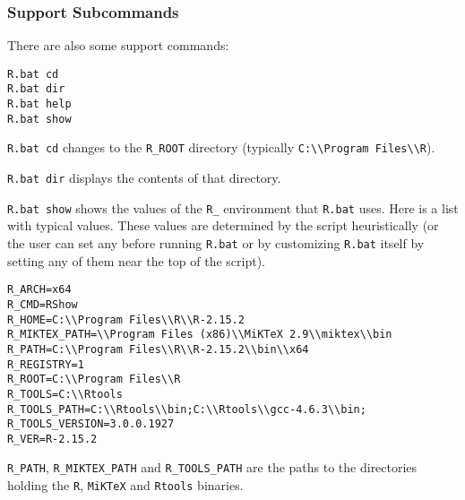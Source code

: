 \subsubsection{Support Subcommands}

There are also some support commands:

\begin{verbatim}
R.bat cd
R.bat dir
R.bat help
R.bat show
\end{verbatim}

\texttt{R.bat cd} changes to the \texttt{R\_ROOT} directory (typically
\texttt{C:\textbackslash{}\textbackslash{}Program Files\textbackslash{}\textbackslash{}R}).

\texttt{R.bat dir} displays the contents of that directory.

\texttt{R.bat show} shows the values of the \texttt{R\_} environment
that \texttt{R.bat} uses. Here is a list with typical values. These
values are determined by the script heuristically (or the user can set
any before running \texttt{R.bat} or by customizing \texttt{R.bat}
itself by setting any of them near the top of the script).

\begin{verbatim}
R_ARCH=x64
R_CMD=RShow
R_HOME=C:\\Program Files\\R\\R-2.15.2
R_MIKTEX_PATH=\\Program Files (x86)\\MiKTeX 2.9\\miktex\\bin
R_PATH=C:\\Program Files\\R\\R-2.15.2\\bin\\x64
R_REGISTRY=1
R_ROOT=C:\\Program Files\\R
R_TOOLS=C:\\Rtools
R_TOOLS_PATH=C:\\Rtools\\bin;C:\\Rtools\\gcc-4.6.3\\bin;
R_TOOLS_VERSION=3.0.0.1927
R_VER=R-2.15.2
\end{verbatim}

\texttt{R\_PATH}, \texttt{R\_MIKTEX\_PATH} and \texttt{R\_TOOLS\_PATH}
are the paths to the directories holding the \texttt{R}, \texttt{MiKTeX}
and \texttt{Rtools} binaries.

